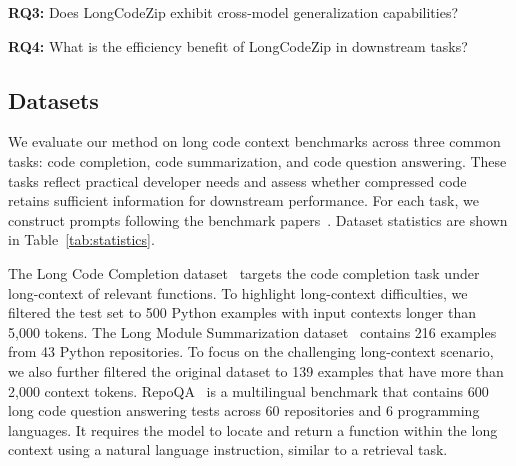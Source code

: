 \documentclass[10pt,conference]{IEEEtran}
\newcommand{\todoc}[2]{{\textcolor{#1}{\textbf{[#2]}}}}
\newcommand{\shi}[1]{\todoc{orange}{Shi: #1}}
\newcommand{\approach}{{LongCodeZip}\xspace} %
\begin{document}
\textbf{RQ3:} Does \approach exhibit cross-model generalization capabilities?

\textbf{RQ4:} What is the efficiency benefit of \approach in downstream tasks?


\subsection{Datasets}

We evaluate our method on long code context benchmarks across three common tasks: code completion, code summarization, and code question answering. These tasks reflect practical developer needs and assess whether compressed code retains sufficient information for downstream performance. For each task, we construct prompts following the benchmark papers~\cite{guo2023longcoder, bogomolov2024long, liu2024repoqa}. Dataset statistics are shown in Table~\ref{tab:statistics}.


The Long Code Completion dataset~\cite{guo2023longcoder} targets the code completion task under long-context of relevant functions. To highlight long-context difficulties, 
we filtered the test set to 500 Python examples with input contexts longer than 5,000 tokens.
The Long Module Summarization dataset~\cite{bogomolov2024long} contains 216 examples from 43 Python repositories. To focus on the challenging long-context scenario, we also further filtered the original dataset to 139 examples that have more than 2,000 context tokens.
RepoQA~\cite{liu2024repoqa} is a multilingual benchmark that contains 600 long code question answering tests across 60 repositories and 6 programming languages. It requires the model to locate and return a function within the long context using a natural language instruction, similar to a retrieval task.
\end{document}
